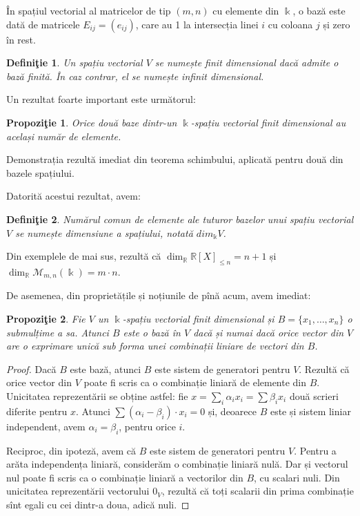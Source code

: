 \documentclass[11pt,a4paper]{article}
\theoremstyle{dotless}
\newtheorem{proposition}{Propozi\c{t}ie}[section]
\theoremstyle{dotlessdr}
\newtheorem{definition}{Defini\c{t}ie}[section]
\begin{document}
În spațiul vectorial al matricelor de tip $(m, n)$ cu elemente din $\Bbbk$, o 
bază este dată de matricele $E_{ij} = (e_{ij})$, care au 1 la intersecția linei 
$i$ cu coloana $j$ și zero în rest.

\begin{definition}
Un spațiu vectorial $V$ se numește \emph{finit dimensional} dacă admite o bază 
finită. În caz contrar, el se numește \emph{infinit dimensional}.
\end{definition}

Un rezultat foarte important este următorul:
\begin{proposition}
Orice două baze dintr-un $\Bbbk$-spațiu vectorial finit dimensional au același 
număr de elemente.
\end{proposition}

Demonstrația rezultă imediat din teorema schimbului, aplicată pentru două din 
bazele spațiului.

Datorită acestui rezultat, avem:
\begin{definition}
Numărul comun de elemente ale tuturor bazelor unui spațiu vectorial $V$ se 
numește \emph{dimensiune} a spațiului, notată $dim_\Bbbk V$.
\end{definition}

Din exemplele de mai sus, rezultă că 
$\dim_\mathbb{R} \mathbb{R}[X]_{\leq n} = n + 1$ și 
$\dim_\mathbb{R} \mathcal{M}_{m,n}(\Bbbk) = m \cdot n$.

De asemenea, din proprietățile și noțiunile de pînă acum, avem imediat:
\begin{proposition}
Fie $V$ un $\Bbbk$-spațiu vectorial finit dimensional și 
$B = \{x_1, \dots, x_n\}$ o submulțime a sa. Atunci $B$ este o bază în $V$ dacă 
și numai dacă orice vector din $V$ are o exprimare unică sub forma unei 
combinații liniare de vectori din $B$.
\end{proposition}

\begin{proof}
Dacă $B$ este bază, atunci $B$ este sistem de generatori pentru $V$. Rezultă că 
orice vector din $V$ poate fi scris ca o combinație liniară de elemente din $B$. 
Unicitatea reprezentării se obține astfel: fie 
$x = \sum_i \alpha_i x_i = \sum \beta_i x_i$ două scrieri diferite pentru $x$. 
Atunci $\sum (\alpha_i - \beta_i) \cdot x_i = 0$ și, deoarece $B$ este și sistem 
liniar independent, avem $\alpha_i = \beta_i$, pentru orice $i$.

Reciproc, din ipoteză, avem că $B$ este sistem de generatori pentru $V$. Pentru 
a arăta independența liniară, considerăm o combinație liniară nulă. Dar și 
vectorul nul poate fi scris ca o combinație liniară a vectorilor din $B$, cu 
scalari nuli. Din unicitatea reprezentării vectorului $0_V$, rezultă că toți 
scalarii din prima combinație sînt egali cu cei dintr-a doua, adică nuli.
\end{proof}
\end{document}
